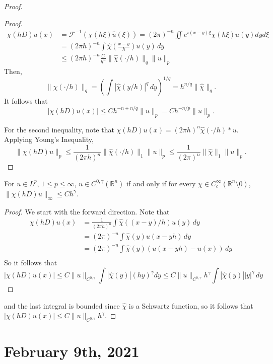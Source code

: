 \documentclass[12pt]{scrartcl}
\newcommand{\R}{\mathbb{R}}
\renewcommand{\hat}{\widehat}
\newcommand{\<}{\langle}
\renewcommand{\>}{\rangle}
\let \mc \mathcal
\begin{document}
\begin{proof}
\begin{proof}
\begin{align*}
\chi(hD)u(x) &= \mc F^{-1}(\chi(h\xi) \hat{u}(\xi)) = (2\pi)^{-n} \iint e^{i(x-y)\xi}\chi(h\xi) u(y)dyd\xi \\
&= (2\pi h)^{-n} \int \hat{\chi}\left (\frac{x-y}{h}\right ) u(y)\,dy \\
&\le (2\pi h)^{-n} \frac{C}{h^n} \|\hat{\chi}(\cdot /h)\|_q \|u\|_p
\end{align*}
Then,
$$\|\hat{\chi}(\cdot /h)\|_q = \left (\int |\hat{\chi} (y/h)|^q \,dy\right )^{1/q} = h^{n/q} \|\hat{\chi}\|_q.$$
It follows that 
$$|\chi(hD)u(x) | \le C h^{-n + n/q} \|u\|_p = C h^{-n/p} \|u\|_p.$$

For the second inequality, note that $\chi(hD)u(x) = (2\pi h)^{n} \hat{\chi}(\cdot/h) * u$.  Applying Young's Inequality,
$$\| \chi(hD) u\|_p \le \frac{1}{(2\pi h)^n}\|\hat{\chi}(\cdot/h)\|_1\|u\|_p \le \frac{1}{(2\pi)^n} \|\hat{\chi}\|_1 \|u\|_p.$$
\end{proof}
\begin{theorem} For $u \in L^p$, $1\le p \le \infty$, $u \in C^{0, \gamma}(\R^n)$ if and only if for every $\chi \in C_c^\infty(\R^n \setminus 0)$, $\|\chi(hD) u\|_\infty \le C h^{\gamma}$.
\end{theorem}
\begin{proof} We start with the forward direction.  Note that 
\begin{align*}
\chi(hD) u(x) &= \frac{1}{(2\pi h)^n} \int \hat{\chi}((x - y)/h) u(y) \,dy \\
&= (2\pi )^{-n} \int \hat{\chi}(y)u(x - yh) \,dy \\
&= (2\pi)^{-n}\int \hat{\chi}(y) (u(x - yh) - u(x))\,dy \\
\end{align*}
So it follows that 
$$|\chi (hD) u(x)| \le C \|u\|_{C^{0, \gamma}} \int |\hat{\chi}(y)| (hy)^\gamma dy \le C \|u\|_{C^{0, \gamma}} h^{\gamma} \int |\hat{\chi}(y)| |y|^\gamma \,dy$$
\end{proof}
and the last integral is bounded since $\hat{\chi}$ is a Schwartz function, so it follows that $|\chi(hD)u(x)| \le C \|u\|_{C^{0, \gamma}} h^{\gamma}$.
\end{proof}

\pagebreak
\section{February 9th, 2021}
\end{document}
